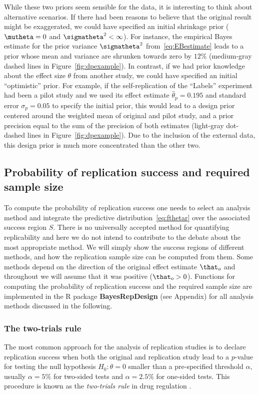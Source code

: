 While these two priors seem sensible for the \citet{Protzko2020} data, it is
interesting to think about alternative scenarios. If there had been reasons to
believe that the original result might be exaggerated, we could have specified
an initial shrinkage prior ($\mutheta = 0$ and $\sigmatheta^{2} < \infty$). For
instance, the empirical Bayes estimate for the prior variance $\sigmatheta^{2}$
from~\eqref{eq:EBestimate} leads to a prior whose mean and variance are shrunken
towards zero by $12$\% (medium-gray
dashed lines in Figure~\ref{fig:dpexample}). In contrast, if we had prior
knowledge about the effect size $\theta$ from another study, we could have
specified an initial ``optimistic'' prior. For example, if the self-replication
of the ``Labels'' experiment had been a pilot study and we used its
effect estimate $\hat{\theta}_{p} = 0.195$ and
standard error $\sigma_{p} = 0.05$ to specify
the initial prior, this would lead to a design prior centered around the
weighted mean of original and pilot study, and a prior precision equal to the
sum of the precision of both estimates (light-gray dot-dashed lines in
Figure~\ref{fig:dpexample}). Due to the inclusion of the external data, this
design prior is much more concentrated than the other two.


\subsection{Probability of replication success and required sample size}
To compute the probability of replication success one needs to select an
analysis method and integrate the predictive distribution~\eqref{eq:fthetar}
over the associated success region $S$. There is no universally accepted method
for quantifying replicability and here we do not intend to contribute to the
debate about the most appropriate method. We will simply show the success
regions of different methods, and how the replication sample size can be
computed from them. Some methods depend on the direction of the original effect
estimate $\that_{o}$ and throughout we will assume that it was positive
($\that_{o} > 0$). Functions for computing the probability of replication
success and the required sample size are implemented in the R package
\textbf{BayesRepDesign} (see Appendix) %
for all analysis methods discussed in the following.


\subsubsection{The two-trials rule}
The most common approach for the analysis of replication studies is to declare
replication success when both the original and replication study lead to a
$p$-value for testing the null hypothesis $H_{0} \colon \theta = 0$ smaller than
a pre-specified threshold $\alpha$, usually $\alpha = 5\%$ for two-sided tests
and $\alpha = 2.5\%$ for one-sided tests. This procedure is known as the
\emph{two-trials rule} in drug regulation \citep{Senn2008}.

